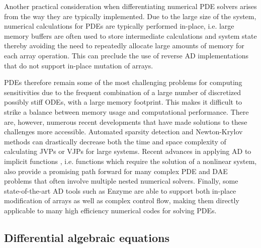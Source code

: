 Another practical consideration when differentiating numerical PDE solvers arises from the way they are typically implemented. 
Due to the large size of the system, numerical calculations for PDEs are typically performed in-place, i.e. large memory buffers are often used to store intermediate calculations and system state thereby avoiding the need to repeatedly allocate large amounts of memory for each array operation. 
This can preclude the use of reverse AD implementations that do not support in-place mutation of arrays.

PDEs therefore remain some of the most challenging problems for computing sensitivities due to the frequent combination of a large number of discretized possibly stiff ODEs, with a large memory footprint. 
This makes it difficult to strike a balance between memory usage and computational performance. 
There are, however, numerous recent developments that have made solutions to these challenges more accessible. 
Automated sparsity detection \cite{gowdaSparsityProgrammingAutomated2019} and Newton-Krylov methods \cite{knollJacobianfreeNewtonKrylov2004,montoisonKrylovJlJulia2023} can drastically decrease both the time and space complexity of calculating JVPs or VJPs for large systems. 
Recent advances in applying AD to implicit functions \cite{blondelEfficientModularImplicit2022a}, i.e. functions which require the solution of a nonlinear system, also provide a promising path forward for many complex PDE and DAE problems that often involve multiple nested numerical solvers. 
Finally, some state-of-the-art AD tools such as Enzyme \cite{moses_Enzyme} are able to support both in-place modification of arrays as well as complex control flow, making them directly applicable to many high efficiency numerical codes for solving PDEs.




\subsection{Differential algebraic equations}

